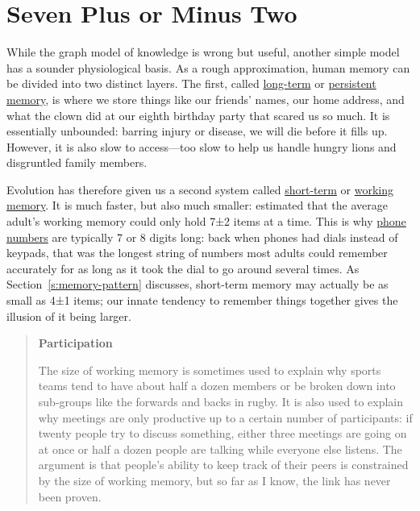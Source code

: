 \section{Seven Plus or Minus Two}\label{s:memory-seven-plus-or-minus}

While the graph model of knowledge is wrong but useful, another simple
model has a sounder physiological basis. As a rough approximation,
human memory can be divided into two distinct layers. The first,
called \protect\hyperlink{g:long-term-memory}{long-term} or \protect\hyperlink{g:persistent-memory}{persistent
memory}, is where we store things like our
friends' names, our home address, and what the clown did at our eighth
birthday party that scared us so much. It is essentially unbounded:
barring injury or disease, we will die before it fills up. However,
it is also slow to access---too slow to help us handle hungry lions
and disgruntled family members.

Evolution has therefore given us a second system called
\protect\hyperlink{g:short-term-memory}{short-term} or \protect\hyperlink{g:working-memory}{working
memory}. It is much faster, but also much smaller:
\cite{Mill1956} estimated that the average adult's working memory
could only hold 7±2 items at a time. This is why \href{https://www.quora.com/Why-did-Bell-Labs-create-phone-numbers-of-7-digits-10-digits-Is-there-a-reason-that-dashes-and-brackets-are-used}{phone
numbers} are typically 7 or 8 digits long: back when
phones had dials instead of keypads, that was the longest string of
numbers most adults could remember accurately for as long as it took
the dial to go around several times. As Section~\ref{s:memory-pattern}
discusses, short-term memory may actually be as small as 4±1 items;
our innate tendency to remember things together gives the illusion of
it being larger.

\begin{quote}\setlength{\parindent}{0pt}
\textbf{Participation}

The size of working memory is sometimes used to explain why sports
teams tend to have about half a dozen members or be broken down into
sub-groups like the forwards and backs in rugby. It is also used to
explain why meetings are only productive up to a certain number of
participants: if twenty people try to discuss something, either three
meetings are going on at once or half a dozen people are talking while
everyone else listens. The argument is that people's ability to keep
track of their peers is constrained by the size of working memory, but
so far as I know, the link has never been proven.
\end{quote}

